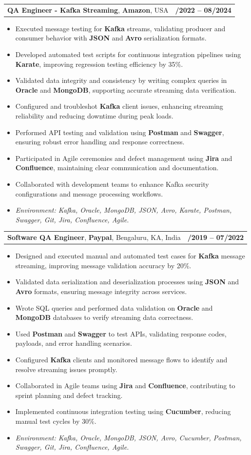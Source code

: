 \documentclass[letterpaper,11pt]{article}
\makeatletter
\newcommand{\resumeItem}[1]{
  \item\footnotesize{
    {#1 \vspace{-2pt}}
  }
}
\newcommand{\resumeSubheading}[4]{
  \vspace{-2pt}\item
    \begin{tabular*}{1.0\textwidth}[t]{l@{\extracolsep{\fill}}r}
      \textbf{\fontsize{10pt}{14pt}\selectfont #3}, \textbf{\fontsize{10pt}{14pt}\selectfont #1}, \fontsize{10pt}{14pt}\selectfont #4 & \textbf{\fontsize{10pt}{14pt}\selectfont #2} \\
    \end{tabular*}\vspace{-7pt}
}
\newcommand{\resumeItemListStart}{\begin{itemize}[leftmargin=*]}
\newcommand{\resumeItemListEnd}{\end{itemize}\vspace{-5pt}}
\makeatother
\begin{document}
\resumeSubheading
{Amazon}{10/2022 -- 08/2024}
{QA Engineer - Kafka Streaming}{USA}
\resumeItemListStart
  \resumeItem{Executed message testing for \textbf{Kafka} streams, validating producer and consumer behavior with \textbf{JSON} and \textbf{Avro} serialization formats.}
  \resumeItem{Developed automated test scripts for continuous integration pipelines using \textbf{Karate}, improving regression testing efficiency by 35\%.}
  \resumeItem{Validated data integrity and consistency by writing complex queries in \textbf{Oracle} and \textbf{MongoDB}, supporting accurate streaming data verification.}
  \resumeItem{Configured and troubleshot \textbf{Kafka} client issues, enhancing streaming reliability and reducing downtime during peak loads.}
  \resumeItem{Performed API testing and validation using \textbf{Postman} and \textbf{Swagger}, ensuring robust error handling and response correctness.}
  \resumeItem{Participated in Agile ceremonies and defect management using \textbf{Jira} and \textbf{Confluence}, maintaining clear communication and documentation.}
  \resumeItem{Collaborated with development teams to enhance Kafka security configurations and message processing workflows.}
  \resumeItem{\textit{Environment: Kafka, Oracle, MongoDB, JSON, Avro, Karate, Postman, Swagger, Git, Jira, Confluence, Agile.}}
\resumeItemListEnd

\resumeSubheading
{Paypal}{08/2019 -- 07/2022}
{Software QA Engineer}{Bengaluru, KA, India}
\resumeItemListStart
  \resumeItem{Designed and executed manual and automated test cases for \textbf{Kafka} message streaming, improving message validation accuracy by 20\%.}
  \resumeItem{Validated data serialization and deserialization processes using \textbf{JSON} and \textbf{Avro} formats, ensuring message integrity across services.}
  \resumeItem{Wrote SQL queries and performed data validation on \textbf{Oracle} and \textbf{MongoDB} databases to verify streaming data correctness.}
  \resumeItem{Used \textbf{Postman} and \textbf{Swagger} to test APIs, validating response codes, payloads, and error handling scenarios.}
  \resumeItem{Configured \textbf{Kafka} clients and monitored message flows to identify and resolve streaming issues promptly.}
  \resumeItem{Collaborated in Agile teams using \textbf{Jira} and \textbf{Confluence}, contributing to sprint planning and defect tracking.}
  \resumeItem{Implemented continuous integration testing using \textbf{Cucumber}, reducing manual test cycles by 30\%.}
  \resumeItem{\textit{Environment: Kafka, Oracle, MongoDB, JSON, Avro, Cucumber, Postman, Swagger, Git, Jira, Confluence, Agile.}}
\resumeItemListEnd
\end{document}

